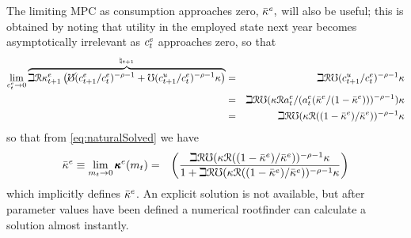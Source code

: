 \documentclass{handout}
\begin{document}
The limiting MPC as consumption approaches zero, $\bar{\kappa}^{e},$ will also be useful; this is obtained
by noting that utility in the employed state next year becomes asymptotically irrelevant as $c^{e}_{t}$ approaches zero, so that 
\begin{eqnarray*}
  \lim_{c^{e}_{t} \rightarrow 0}  \overbrace{ \beth \mathcal{R} \kappa^{e}_{t+1} \left(\cancel{\mho} (c^{e}_{t+1}/c^{e}_{t})^{-\rho-1}  + \mho (c^{u}_{t+1}/c^{e}_{t})^{-\rho-1}\kappa\right)}^{\natural_{t+1}} & = & \beth \mathcal{R} \mho (c^{u}_{t+1}/c^{e}_{t})^{-\rho-1}\kappa
\\  & = & \beth \mathcal{R} \mho (\kappa \mathcal{R} a^{e}_{t}/(a^{e}_{t}(\bar{\kappa}^{e}/(1-\bar{\kappa}^{e})))^{-\rho-1})\kappa
\\ & = & \beth \mathcal{R} \mho (\kappa \mathcal{R} ((1-\bar{\kappa}^{e})/\bar{\kappa}^{e}))^{-\rho-1}\kappa
\end{eqnarray*}
so that from \eqref{eq:naturalSolved} we have 
\begin{eqnarray}
  \bar{\kappa}^{e} \equiv \lim_{m_{t} \rightarrow 0} \pmb{\kappa}^{e}(m_{t}) & = & \left(\frac{
\beth \mathcal{R} \mho (\kappa \mathcal{R} ((1-\bar{\kappa}^{e})/\bar{\kappa}^{e}))^{-\rho-1}\kappa
}{1+
\beth \mathcal{R} \mho (\kappa \mathcal{R} ((1-\bar{\kappa}^{e})/\bar{\kappa}^{e}))^{-\rho-1}\kappa
}\right) \label{eq:MPCat0}
\end{eqnarray}
which implicitly defines $\bar{\kappa}^{e}$.  An explicit solution is not available, but after 
parameter values have been defined a numerical rootfinder can calculate a solution almost instantly. 
\end{document}

